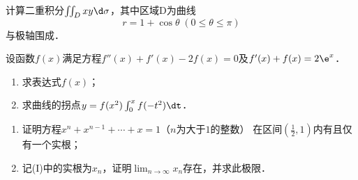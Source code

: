 \documentclass[plain,noanswer,medmath]{../../template/jnuexam}
\begin{document}
\begin{problem}[points=10]计算二重积分$\iint_D xy\d\sigma$，其中区域D为曲线
$$r = 1 + \cos \theta \;\left(0 \le \theta \le \pi \right)$$
与极轴围成．
\end{problem}


\begin{problem}[points=11]
设函数$f(x)$满足方程$f''(x) + f'(x) - 2f(x) = 0$及$f'(x) + f(x) = 2\e^x$．
\begin{enumerate}
\item 求表达式$f(x)$；
\item 求曲线的拐点$y = f(x^2)\int_0^x f(- t^2)\dt$．
\end{enumerate}
\end{problem}




\begin{problem}[points=11]
\begin{enumerate}
\item
证明方程$x^n + x^{n - 1} + \cdots + x = 1$（$n$为大于$1$的整数）%
在区间$\left(\frac{1}{2},1 \right)$内有且仅有一个实根；
\item
记(I)中的实根为$x_n$，证明$\lim_{n \to \infty} x_n$存在，并求此极限．
\end{enumerate}
\end{problem}




\end{document}
